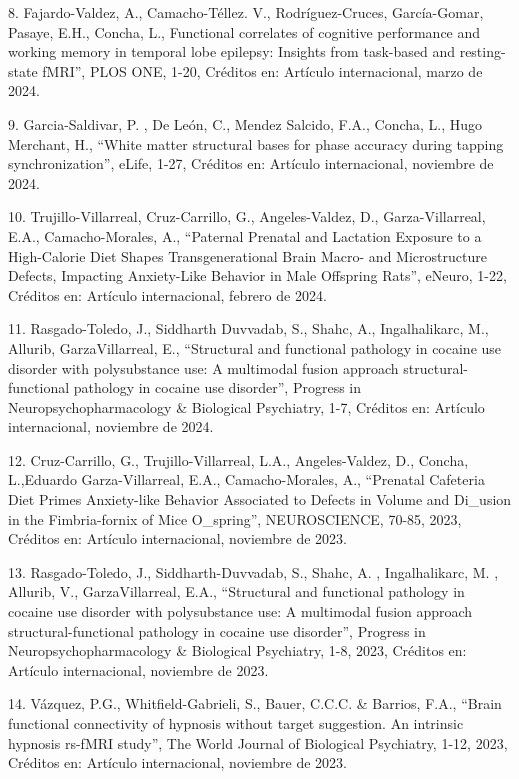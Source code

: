 8. Fajardo-Valdez, A., Camacho-Téllez. V., Rodríguez-Cruces, García-Gomar, Pasaye, E.H., Concha, L., Functional correlates of 
cognitive performance and working memory in temporal lobe epilepsy: Insights from task-based and resting-state fMRI”, PLOS ONE, 
1-20, Créditos en: Artículo internacional, marzo de 2024.

9. Garcia-Saldivar, P. , De León, C., Mendez Salcido, F.A., Concha, L., Hugo Merchant, H., “White matter structural bases for 
phase accuracy during tapping synchronization”, eLife, 1-27, Créditos en: Artículo internacional, noviembre de 2024.

10. Trujillo-Villarreal, Cruz-Carrillo, G., Angeles-Valdez, D., Garza-Villarreal, E.A., Camacho-Morales, A., “Paternal Prenatal 
and Lactation Exposure to a High-Calorie Diet Shapes Transgenerational Brain Macro- and Microstructure Defects, Impacting 
Anxiety-Like Behavior in Male Offspring Rats”, eNeuro, 1-22, Créditos en: Artículo internacional, febrero de 2024.

11. Rasgado-Toledo, J., Siddharth Duvvadab, S., Shahc, A., Ingalhalikarc, M., Allurib, GarzaVillarreal, E., “Structural and 
functional pathology in cocaine use disorder with polysubstance use: A multimodal fusion approach structural-functional 
pathology in cocaine use disorder”, Progress in Neuropsychopharmacology & Biological Psychiatry, 1-7, Créditos en: Artículo 
internacional, noviembre de 2024.

12. Cruz-Carrillo, G., Trujillo-Villarreal, L.A., Angeles-Valdez, D., Concha, L.,Eduardo Garza-Villarreal, E.A., 
Camacho-Morales, A., “Prenatal Cafeteria Diet Primes Anxiety-like Behavior Associated to Defects in Volume and Di_usion in the 
Fimbria-fornix of Mice O_spring”, NEUROSCIENCE, 70-85, 2023, Créditos en: Artículo internacional, noviembre de 2023.

13. Rasgado-Toledo, J., Siddharth-Duvvadab, S., Shahc, A. , Ingalhalikarc, M. , Allurib, V., GarzaVillarreal, E.A., “Structural 
and functional pathology in cocaine use disorder with polysubstance use: A multimodal fusion approach structural-functional 
pathology in cocaine use disorder”, Progress in Neuropsychopharmacology & Biological Psychiatry, 1-8, 2023, Créditos en: 
Artículo internacional, noviembre de 2023.

14. Vázquez, P.G., Whitfield-Gabrieli, S., Bauer, C.C.C. & Barrios, F.A., “Brain functional connectivity of hypnosis without 
target suggestion. An intrinsic hypnosis rs-fMRI study”, The World Journal of Biological Psychiatry, 1-12, 2023, Créditos en: 
Artículo internacional, noviembre de 2023.

